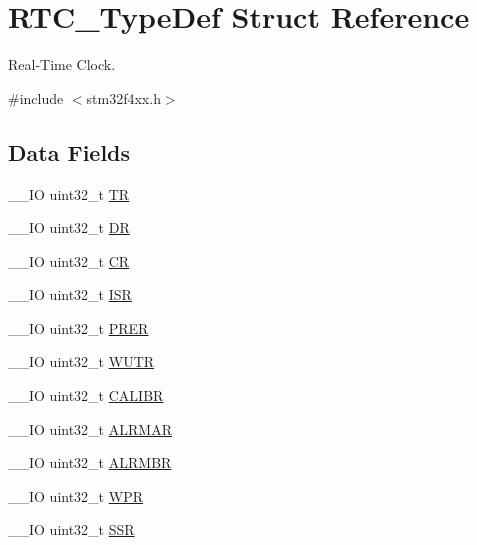 \hypertarget{struct_r_t_c___type_def}{\section{R\-T\-C\-\_\-\-Type\-Def Struct Reference}
\label{struct_r_t_c___type_def}
}


Real-\/\-Time Clock.  




{\ttfamily \#include $<$stm32f4xx.\-h$>$}

\subsection*{Data Fields}
\begin{DoxyCompactItemize}
\item 
\-\_\-\-\_\-\-I\-O uint32\-\_\-t \hyperlink{struct_r_t_c___type_def_a63d179b7a36a715dce7203858d3be132}{T\-R}
\item 
\-\_\-\-\_\-\-I\-O uint32\-\_\-t \hyperlink{struct_r_t_c___type_def_a3df0d8dfcd1ec958659ffe21eb64fa94}{D\-R}
\item 
\-\_\-\-\_\-\-I\-O uint32\-\_\-t \hyperlink{struct_r_t_c___type_def_ab40c89c59391aaa9d9a8ec011dd0907a}{C\-R}
\item 
\-\_\-\-\_\-\-I\-O uint32\-\_\-t \hyperlink{struct_r_t_c___type_def_ab3c49a96815fcbee63d95e1e74f20e75}{I\-S\-R}
\item 
\-\_\-\-\_\-\-I\-O uint32\-\_\-t \hyperlink{struct_r_t_c___type_def_ac9b4c6c5b29f3461ce3f875eea69f35b}{P\-R\-E\-R}
\item 
\-\_\-\-\_\-\-I\-O uint32\-\_\-t \hyperlink{struct_r_t_c___type_def_ac5b3c8be61045a304d3076d4714d29f2}{W\-U\-T\-R}
\item 
\-\_\-\-\_\-\-I\-O uint32\-\_\-t \hyperlink{struct_r_t_c___type_def_ab97f3e9584dda705dc10a5f4c5f6e636}{C\-A\-L\-I\-B\-R}
\item 
\-\_\-\-\_\-\-I\-O uint32\-\_\-t \hyperlink{struct_r_t_c___type_def_ac005b1a5bc52634d5a34578cc9d2c3f6}{A\-L\-R\-M\-A\-R}
\item 
\-\_\-\-\_\-\-I\-O uint32\-\_\-t \hyperlink{struct_r_t_c___type_def_a4e513deb9f58a138ad9f317cc5a3555d}{A\-L\-R\-M\-B\-R}
\item 
\-\_\-\-\_\-\-I\-O uint32\-\_\-t \hyperlink{struct_r_t_c___type_def_a6204786b050eb135fabb15784698e86e}{W\-P\-R}
\item 
\-\_\-\-\_\-\-I\-O uint32\-\_\-t \hyperlink{struct_r_t_c___type_def_a8a868e5e76b52ced04c536be3dee08ec}{S\-S\-R}

\end{DoxyCompactItemize}
